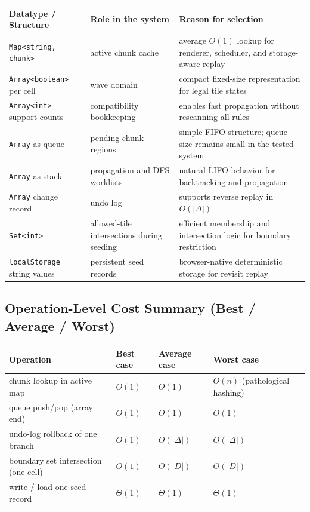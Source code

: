 \documentclass[12pt,a4paper]{report}
\begin{document}
\begin{center}
\begin{tabular}{>{\raggedright\arraybackslash}p{3.5cm} >{\raggedright\arraybackslash}p{4.2cm} >{\raggedright\arraybackslash}p{4.5cm}}
\toprule
Datatype / Structure & Role in the system & Reason for selection \\
\midrule
\texttt{Map<string, chunk>} & active chunk cache & average $O(1)$ lookup for renderer, scheduler, and storage-aware replay \\
\texttt{Array<boolean>} per cell & wave domain & compact fixed-size representation for legal tile states \\
\texttt{Array<int>} support counts & compatibility bookkeeping & enables fast propagation without rescanning all rules \\
\texttt{Array} as queue & pending chunk regions & simple FIFO structure; queue size remains small in the tested system \\
\texttt{Array} as stack & propagation and DFS worklists & natural LIFO behavior for backtracking and propagation \\
\texttt{Array} change record & undo log & supports reverse replay in $O(|\Delta|)$ \\
\texttt{Set<int>} & allowed-tile intersections during seeding & efficient membership and intersection logic for boundary restriction \\
\texttt{localStorage} string values & persistent seed records & browser-native deterministic storage for revisit replay \\
\bottomrule
\end{tabular}
\end{center}

\subsection*{Operation-Level Cost Summary (Best / Average / Worst)}
\begin{center}
\small
\begin{tabular}{p{3.7cm} p{2.2cm} p{2.2cm} p{2.2cm}}
\toprule
Operation & Best case & Average case & Worst case \\
\midrule
chunk lookup in active map & $O(1)$ & $O(1)$ & $O(n)$ (pathological hashing) \\
queue push/pop (array end) & $O(1)$ & $O(1)$ & $O(1)$ \\
undo-log rollback of one branch & $O(1)$ & $O(|\Delta|)$ & $O(|\Delta|)$ \\
boundary set intersection (one cell) & $O(1)$ & $O(|D|)$ & $O(|D|)$ \\
write / load one seed record & $\Theta(1)$ & $\Theta(1)$ & $\Theta(1)$ \\
\bottomrule
\end{tabular}
\end{center}
\end{document}
